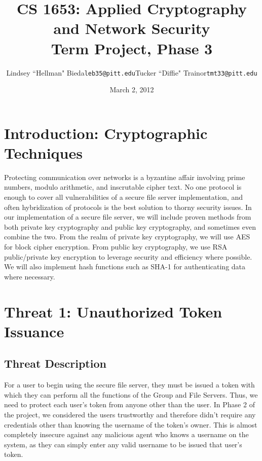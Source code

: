 \documentclass[11pt]{article}
\title{CS 1653: Applied Cryptography and Network Security\\Term Project, Phase 3}
\author{Lindsey ``Hellman" Bieda\quad\texttt{leb35@pitt.edu}\qquad Tucker ``Diffie" Trainor\quad\texttt{tmt33@pitt.edu}}
\date{March 2, 2012} %
\begin{document}
\maketitle
\section{Introduction: Cryptographic Techniques}
Protecting communication over networks is a byzantine affair involving prime numbers, modulo arithmetic, and inscrutable cipher text. No one protocol is enough to cover all vulnerabilities of a secure file server implementation, and often hybridization of protocols is the best solution to thorny security issues. In our implementation of a secure file server, we will include proven methods from both private key cryptography and public key cryptography, and sometimes even combine the two. From the realm of private key cryptography, we will use AES for block cipher encryption. From public key cryptography, we use RSA public/private key encryption to leverage security and efficiency where possible. We will also implement hash functions such as SHA-1 for authenticating data where necessary.
\section{Threat 1: Unauthorized Token Issuance}
\subsection{Threat Description}
For a user to begin using the secure file server, they must be issued a token with which they can perform all the functions of the Group and File Servers. Thus, we need to protect each user's token from anyone other than the user. In Phase 2 of the project, we considered the users trustworthy and therefore didn't require any credentials other than knowing the username of the token's owner. This is almost completely insecure against any malicious agent who knows a username on the system, as they can simply enter any valid username to be issued that user's token.
\end{document}
